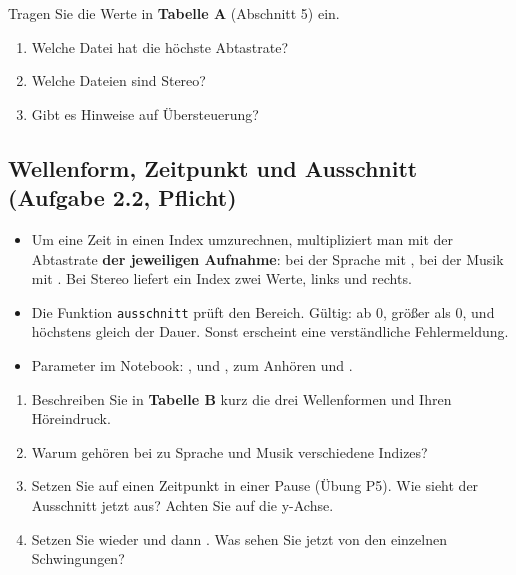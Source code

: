 \documentclass[11pt]{article}
\begin{document}
\begin{block}
Tragen Sie die Werte in \textbf{Tabelle A} (Abschnitt 5) ein.
\begin{enumerate}
  \item Welche Datei hat die höchste Abtastrate?
  \item Welche Dateien sind Stereo?
  \item Gibt es Hinweise auf Übersteuerung?
\end{enumerate}
\end{block}

\subsection[Wellenform, Zeitpunkt und Ausschnitt]{Wellenform, Zeitpunkt und Ausschnitt (Aufgabe 2.2, Pflicht)}


\begin{itemize}
  \item Um eine Zeit in einen Index umzurechnen, multipliziert man mit der Abtastrate \textbf{der jeweiligen Aufnahme}: bei der Sprache mit , bei der Musik mit . Bei Stereo liefert ein Index zwei Werte, links und rechts.
  \item Die Funktion \texttt{ausschnitt} prüft den Bereich. Gültig:  ab 0,  größer als 0, und  höchstens gleich der Dauer. Sonst erscheint eine verständliche Fehlermeldung.
  \item Parameter im Notebook: ,  und , zum Anhören  und .
\end{itemize}

\begin{block}
\begin{enumerate}
  \item Beschreiben Sie in \textbf{Tabelle B} kurz die drei Wellenformen und Ihren Höreindruck.
  \item Warum gehören bei  zu Sprache und Musik verschiedene Indizes?
  \item Setzen Sie  auf einen Zeitpunkt in einer Pause (Übung P5). Wie sieht der Ausschnitt jetzt aus? Achten Sie auf die y-Achse.
  \item Setzen Sie wieder  und dann . Was sehen Sie jetzt von den einzelnen Schwingungen?
\end{enumerate}
\end{block}
\end{document}
